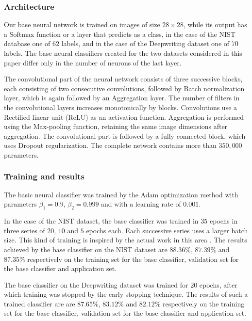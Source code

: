 \documentclass{article}
\begin{document}
\subsubsection{Architecture}

Our base neural network is trained on images of size $28 \times 28$, while its output has a Softmax function or a layer that predicts as a class, in the case of the NIST database one of $62$ labels,
and in the case of the Deepwriting dataset one of $70$ labels.
The base neural classifiers created for the two datasets considered in this paper differ only in the number of neurons of the last layer.

The convolutional part of the neural network consists of three successive blocks, each consisting of two consecutive convolutions, followed by Batch normalization layer,
which is again followed by an Aggregation layer.
The number of filters in the convolutional layers increases monotonically by blocks.
Convolutions use a Rectified linear unit (ReLU) as an activation function.
Aggregation is performed using the Max-pooling function, retaining the same image dimensions after aggregation.
The convolutional part is followed by a fully connected block, which uses Dropout regularization.
The complete network contains more than $350,000$ parameters.

\subsubsection{Training and results}

The basic neural classifier was trained by the Adam optimization method with parameters $\beta_1=0.9$, $\beta_2=0.999$ and with a learning rate of $0.001$.

In the case of the NIST dataset, the base classifier was trained in $35$ epochs in three series of $20$, $10$ and $5$ epochs each.
Each successive series uses a larger batch size.
This kind of training is inspired by the actual work in this area \citet{lrbs}.
The results achieved by the base classifier on the NIST dataset are $88.36\%$, $87.39\%$ and $87.35\%$ respectively on the training set for the base classifier, validation set for the base classifier and application set.

The base classifier on the Deepwriting dataset was trained for 20 epochs, after which training was stopped by the early stopping technique.
The results of such a trained classifier are are $87.65\%$, $83.12\%$ and $82.12\%$ respectively on the training set for the base classifier, validation set for the base classifier and application set.
\end{document}
